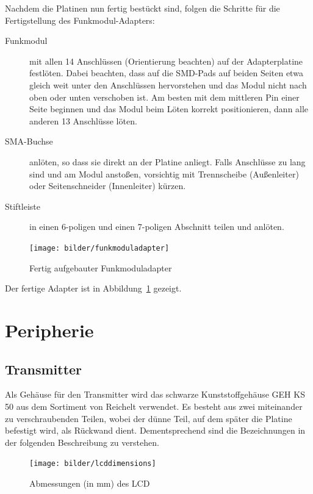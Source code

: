 \documentclass[paper=a4, parskip, numbers=noenddot, toc=listof, headsepline]{scrbook}
\begin{document}
			Nachdem die Platinen nun fertig bestückt sind, folgen die Schritte für die Fertigstellung des Funkmodul-Adapters:
			\begin{description}
				\item[Funkmodul] mit allen 14 Anschlüssen (Orientierung beachten) auf der Adapterplatine festlöten. Dabei beachten, dass auf die SMD-Pads auf beiden Seiten etwa gleich weit unter den Anschlüssen hervorstehen und das Modul nicht nach oben oder unten verschoben ist. Am besten mit dem mittleren Pin einer Seite beginnen und das Modul beim Löten korrekt positionieren, dann alle anderen 13 Anschlüsse löten.
				\item[SMA-Buchse] anlöten, so dass sie direkt an der Platine anliegt. Falls Anschlüsse zu lang sind und am Modul anstoßen, vorsichtig mit Trennscheibe (Außenleiter) oder Seitenschneider (Innenleiter) kürzen.
				\item[Stiftleiste] in einen 6-poligen und einen 7-poligen Abschnitt teilen und anlöten.
			\end{description}

			\begin{figure}
				\centering
				\texttt{[image: bilder/funkmoduladapter]}
				\caption{Fertig aufgebauter Funkmoduladapter}
				\label{fig:funkmoduladapter}
			\end{figure}

			Der fertige Adapter ist in Abbildung~\ref{fig:funkmoduladapter} gezeigt.

		\section{Peripherie}

			\subsection{Transmitter}
				Als Gehäuse für den Transmitter wird das schwarze Kunststoffgehäuse GEH KS 50 aus dem Sortiment von Reichelt verwendet. Es besteht aus zwei miteinander zu verschraubenden Teilen, wobei der dünne Teil, auf dem später die Platine befestigt wird, als Rückwand dient. Dementsprechend sind die Bezeichnungen in der folgenden Beschreibung zu verstehen.

				\begin{figure}
					\centering
					\texttt{[image: bilder/lcddimensions]}
					\caption{Abmessungen (in mm) des LCD}
					\label{fig:lcddimensions}
				\end{figure}
\end{document}
